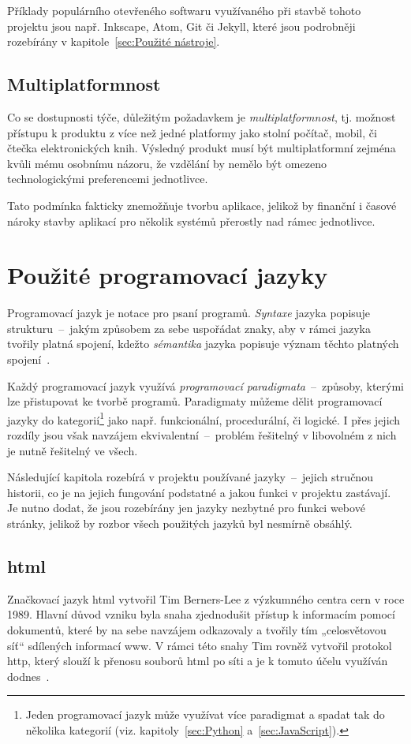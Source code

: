 \documentclass[a4paper, 12pt]{article}
\newcommand*{\fullref}[1]{\hyperref[{#1}]{\ref*{#1}}}
\begin{document}
  Příklady populárního otevřeného softwaru využívaného při stavbě tohoto projektu jsou např. Inkscape, Atom, Git či Jekyll, které jsou podrobněji rozebírány v kapitole~\fullref{sec:Použité nástroje}.


  \subsection{Multiplatformnost}
  Co se dostupnosti týče, důležitým požadavkem je \emph{multiplatformnost}, tj. možnost přístupu k produktu z více než jedné platformy jako stolní počítač, mobil, či čtečka elektronických knih. Výsledný produkt musí být multiplatformní zejména kvůli mému osobnímu názoru, že vzdělání by nemělo být omezeno technologickými preferencemi jednotlivce.

  Tato podmínka fakticky znemožňuje tvorbu aplikace, jelikož by finanční i časové nároky stavby aplikací pro několik systémů přerostly nad rámec jednotlivce.


  \section{Použité programovací jazyky} \label{sec:Použité programovací jazyky}
  Programovací jazyk je notace pro psaní programů. \emph{Syntaxe} jazyka popisuje strukturu~--~jakým způsobem za sebe uspořádat znaky, aby v rámci jazyka tvořily platná spojení, kdežto \emph{sémantika} jazyka popisuje význam těchto platných spojení~\cite{intro-to-programming-languages}.

  Každý programovací jazyk využívá \emph{programovací paradigmata}~--~způsoby, kterými lze přistupovat ke tvorbě programů. Paradigmaty můžeme dělit programovací jazyky do kategorií\footnote{Jeden programovací jazyk může využívat více paradigmat a spadat tak do několika kategorií (viz. kapitoly~\fullref{sec:Python} a~\fullref{sec:JavaScript}).} jako např. funkcionální, procedurální, či logické. I přes jejich rozdíly jsou však navzájem ekvivalentní~--~problém řešitelný v libovolném z nich je nutně řešitelný ve všech.

  Následující kapitola rozebírá v projektu používané jazyky~--~jejich stručnou historii, co je na jejich fungování podstatné a jakou funkci v projektu zastávají. Je nutno dodat, že jsou rozebírány jen jazyky nezbytné pro funkci webové stránky, jelikož by rozbor všech použitých jazyků byl nesmírně obsáhlý.


  \subsection{\acrshort{html}} \label{sec:HTML}
  Značkovací jazyk \gls{html} vytvořil Tim Berners-Lee z výzkumného centra \gls{cern} v roce 1989. Hlavní důvod vzniku byla snaha zjednodušit přístup k informacím pomocí dokumentů, které by na sebe navzájem odkazovaly a tvořily tím „celosvětovou síť“ sdílených informací \gls{www}. V rámci této snahy Tim rovněž vytvořil protokol \gls{http}, který slouží k přenosu souborů \gls{html} po síti a je k tomuto účelu využíván dodnes~\cite{html-history}.
\end{document}
